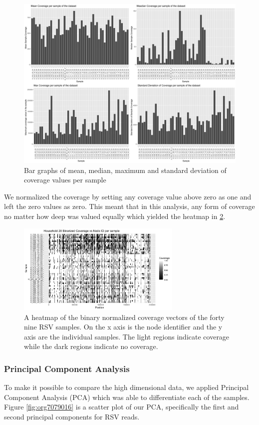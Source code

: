 \documentclass[10pt, a4paper]{article}
\begin{document}
\begin{figure}[h]
\centering
\includegraphics[width=.9\linewidth]{../Figures/RSV/structure_of_coverage_data.png}
\caption[RSV Structure of the Data]{\label{fig:org41d2bc5}
Bar graphs of mean, median, maximum and standard deviation of coverage values per sample}
\end{figure}


We normalized the coverage by setting any coverage value above zero as one and 
left the zero values as zero. This meant that in this analysis, any form of
coverage no matter how deep was valued equally which yielded the heatmap in
\ref{fig:org064f6e0}.

\begin{figure}[h!]
\centering
\includegraphics[width=0.7\textwidth]{../Figures/RSV/Heatmap.png}
\caption[RSV heatmap]{\label{fig:org064f6e0}
A heatmap of the binary normalized coverage vectors of the forty nine RSV samples. On the x axis is the node identifier and the y axis are the individual samples. The light regions indicate coverage while the dark regions indicate no coverage.}
\end{figure}

\newpage
\subsubsection{Principal Component Analysis}
\label{sec:orgf497db6}
To make it possible to compare the high dimensional data, we applied Principal 
Component Analysis (PCA) which was able to differentiate each of the samples.
Figure \ref{fig:org7079016} is a scatter plot of our PCA, specifically the first and 
second principal components for RSV reads.
\end{document}
